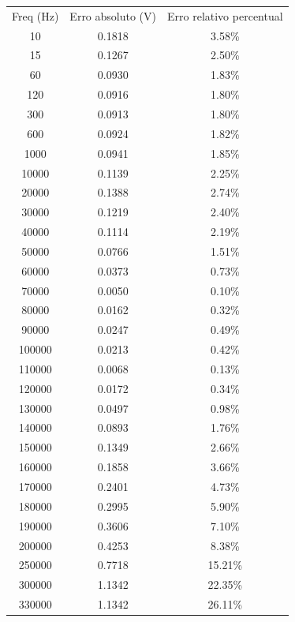 \documentclass[12pt,twoside, a4paper, twocolumn]{article}
\begin{document}
\begin{center}
    \begin{tabular}{ |c|c|c| }
        \hline
        Freq (Hz) & Erro absoluto (V) & Erro relativo percentual  \\
        10        & 0.1818   & 3.58\%  \\
        15        & 0.1267   & 2.50\%  \\
        60        & 0.0930   & 1.83\%  \\
        120       & 0.0916   & 1.80\%  \\
        300       & 0.0913   & 1.80\%  \\
        600       & 0.0924   & 1.82\%  \\
        1000      & 0.0941   & 1.85\%  \\
        10000     & 0.1139   & 2.25\%  \\
        20000     & 0.1388   & 2.74\%  \\
        30000     & 0.1219   & 2.40\%  \\
        40000     & 0.1114   & 2.19\%  \\
        50000     & 0.0766   & 1.51\%  \\
        60000     & 0.0373   & 0.73\% \\
        70000     & 0.0050   & 0.10\%  \\
        80000     & 0.0162   & 0.32\%  \\
        90000     & 0.0247   & 0.49\%  \\
        100000    & 0.0213   & 0.42\%  \\
        110000    & 0.0068   & 0.13\%  \\
        120000    & 0.0172   & 0.34\%  \\
        130000    & 0.0497   & 0.98\%  \\
        140000    & 0.0893   & 1.76\%  \\
        150000    & 0.1349   & 2.66\%  \\
        160000    & 0.1858   & 3.66\%  \\
        170000    & 0.2401   & 4.73\%  \\
        180000    & 0.2995   & 5.90\%  \\
        190000    & 0.3606   & 7.10\%  \\
        200000    & 0.4253   & 8.38\%  \\
        250000    & 0.7718   & 15.21\% \\
        300000    & 1.1342   & 22.35\% \\
        330000    & 1.1342   & 26.11\% \\
        \hline
    \end{tabular}
\end{center}
\end{document}
